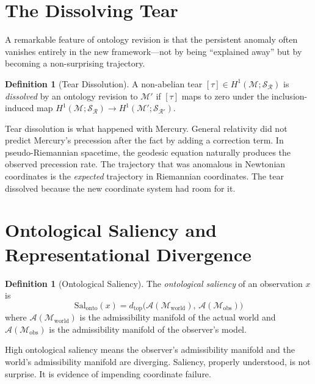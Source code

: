 \documentclass[12pt,oneside]{book}
\theoremstyle{plain}
\theoremstyle{definition}
\newtheorem{definition}[theorem]{Definition}
\theoremstyle{remark}
\newcommand{\R}{\mathcal{R}}
\newcommand{\M}{\mathcal{M}}
\newcommand{\1}{\mathbf{1}}
\begin{document}
\section{The Dissolving Tear}

A remarkable feature of ontology revision is that the persistent anomaly often vanishes entirely in the new framework---not by being ``explained away'' but by becoming a non-surprising trajectory.

\begin{definition}[Tear Dissolution]
A non-abelian tear $[\tau] \in H^1(\M; \mathcal{S}_{\R})$ is \emph{dissolved} by an ontology revision to $\M'$ if $[\tau]$ maps to zero under the inclusion-induced map $H^1(\M; \mathcal{S}_{\R}) \to H^1(\M'; \mathcal{S}_{\R'})$.
\end{definition}

Tear dissolution is what happened with Mercury. General relativity did not predict Mercury's precession after the fact by adding a correction term. In pseudo-Riemannian spacetime, the geodesic equation naturally produces the observed precession rate. The trajectory that was anomalous in Newtonian coordinates is the \emph{expected} trajectory in Riemannian coordinates. The tear dissolved because the new coordinate system had room for it.

\section{Ontological Saliency and Representational Divergence}

\begin{definition}[Ontological Saliency]
The \emph{ontological saliency} of an observation $x$ is
\[
\mathrm{Sal}_{\mathrm{onto}}(x) = d_{\mathrm{top}}\bigl(\mathcal{A}(\M_{\mathrm{world}}),\, \mathcal{A}(\M_{\mathrm{obs}})\bigr)
\]
where $\mathcal{A}(\M_{\mathrm{world}})$ is the admissibility manifold of the actual world and $\mathcal{A}(\M_{\mathrm{obs}})$ is the admissibility manifold of the observer's model.
\end{definition}

High ontological saliency means the observer's admissibility manifold and the world's admissibility manifold are diverging. Saliency, properly understood, is not surprise. It is evidence of impending coordinate failure.
\end{document}
